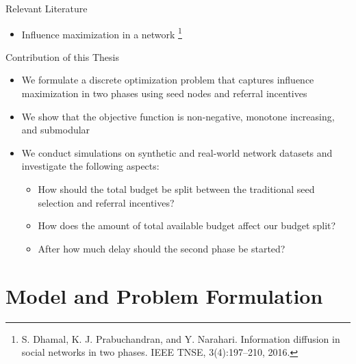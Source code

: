 \documentclass{beamer}
\begin{document}
\begin{frame}{Relevant Literature}
\begin{itemize}
    \item Influence maximization in a network {\color{blue}{in two phases using  seed nodes}}
    \footnote{\scriptsize S. Dhamal, K. J. Prabuchandran, and Y. Narahari.  Information diffusion in social networks in two phases. {IEEE TNSE}, 3(4):197--210, 2016.}
  \end{itemize}
  \vspace{2mm}
\end{frame}

\begin{frame}{Contribution of this Thesis}
\begin{itemize}
\item We formulate a
discrete optimization problem that captures influence maximization 
in two phases using seed nodes and referral incentives

\item We show that the objective
function is non-negative, monotone increasing,
and submodular

\item We conduct simulations on synthetic and real-world network datasets and investigate the following aspects:
\begin{itemize}
\item
How should the total budget be split between the traditional seed selection and referral incentives? 
\item
How does the amount of total available budget affect our budget split?
\item
After how much delay should the second phase be started?
\end{itemize}

\end{itemize}
\end{frame}


\section{Model and Problem Formulation}
\end{document}
